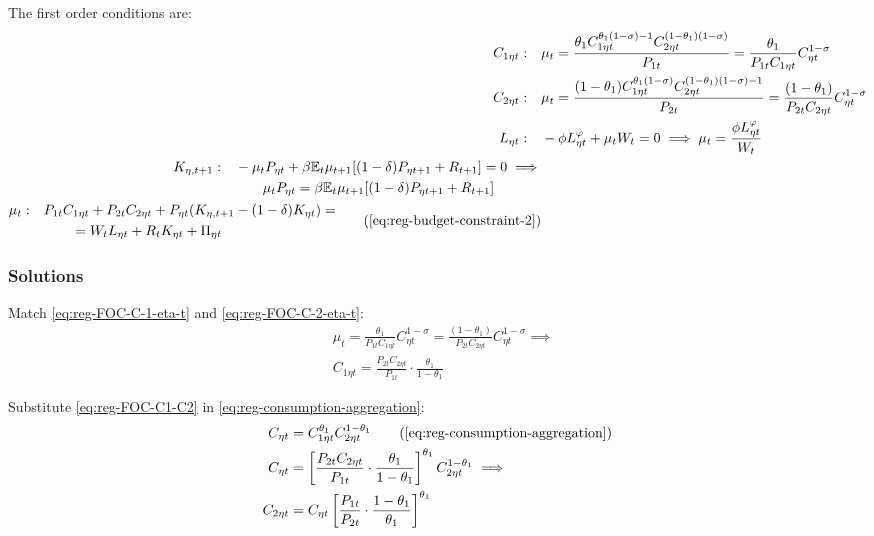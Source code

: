 \documentclass[
	thesis.tex
	]{subfiles}
\begin{document}
The first order conditions are:
\begin{align}
	C_{1\eta t}: \quad & \mu_t = \frac{\theta_1 C_{1\eta t}^{\theta_1 (1 -\sigma) -1} C_{2\eta t}^{(1 -\theta_1)(1 -\sigma)}}{P_{1t}} = \frac{\theta_1}{P_{1t} C_{1\eta t}} C_{\eta t}^{1 -\sigma} \label{eq:reg-FOC-C-1-eta-t} \\
	C_{2\eta t}: \quad & \mu_t = \frac{(1 -\theta_1) C_{1\eta t}^{\theta_1 (1 -\sigma)} C_{2\eta t}^{(1 -\theta_1)(1 -\sigma)-1}}{P_{2t}} = \frac{(1 -\theta_1)}{P_{2t} C_{2\eta t}} C_{\eta t}^{1 -\sigma} \label{eq:reg-FOC-C-2-eta-t} \\
	L_{\eta t}: \quad & -\phi L_{\eta t}^{\varphi} +\mu_t W_t = 0 \implies \mu_t = \frac{\phi L_{\eta t}^{\varphi}}{W_t} \label{eq:reg-household-FOC-Lt} \\
	\begin{split}
		K_{\eta, t+1}: \quad & -\mu_t P_{\eta t} +\beta \mathbb{E}_t \mu_{t+1} [(1-\delta) P_{\eta t+1} + R_{t+1}] = 0 \implies \\ & \qquad \mu_t P_{\eta t} = \beta \mathbb{E}_t \mu_{t+1} [(1-\delta) P_{\eta t+1} + R_{t+1}]
	\end{split} \label{eq:reg-household-FOC-Kt} \\
	\begin{split}
		\mu_t: \quad & P_{1t} C_{1\eta t} + P_{2t} C_{2\eta t} + P_{\eta t} (K_{\eta, t+1} - (1-\delta)K_{\eta t}) = \\ & \qquad = W_t L_{\eta t} + R_t K_{\eta t} + \Pi_{\eta t}
	\end{split} \tag{\ref{eq:reg-budget-constraint-2}}
\end{align}

\subsubsection*{Solutions}

Match \ref{eq:reg-FOC-C-1-eta-t} and \ref{eq:reg-FOC-C-2-eta-t}:
\begin{align}
	& \mu_t = \frac{\theta_1}{P_{1t} C_{1\eta t}} C_{\eta t}^{1 -\sigma} = \frac{(1 -\theta_1)}{P_{2t} C_{2\eta t}} C_{\eta t}^{1 -\sigma} \implies \nonumber \\
	& C_{1\eta t} = \frac{P_{2t} C_{2\eta t}}{P_{1t}} \cdot \frac{\theta_1}{1 -\theta_1} \label{eq:reg-FOC-C1-C2}
\end{align}

Substitute \ref{eq:reg-FOC-C1-C2} in \ref{eq:reg-consumption-aggregation}:
\begin{align}
	C_{\eta t} &= C_{1\eta t}^{\theta_1} C_{2\eta t}^{1-\theta_1} \tag{\ref{eq:reg-consumption-aggregation}} \\
	C_{\eta t} &= \left[ \frac{P_{2t} C_{2\eta t}}{P_{1t}} \cdot \frac{\theta_1}{1 -\theta_1} \right]^{\theta_1} C_{2\eta t}^{1-\theta_1} \implies \nonumber \\
	C_{2\eta t} &= C_{\eta t} \left[ \frac{P_{1t} }{P_{2t}} \cdot \frac{1 -\theta_1}{\theta_1} \right]^{\theta_1} \label{eq:reg-C2-Cn}
\end{align}
\end{document}
